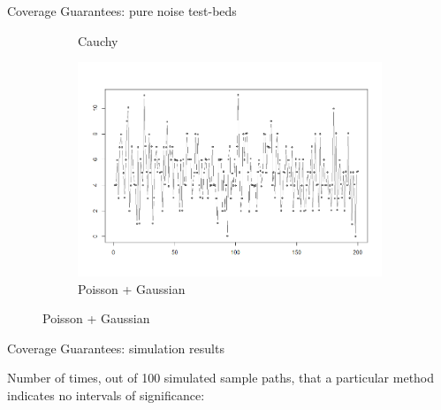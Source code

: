\documentclass{beamer}
\begin{document}
\begin{frame}{Coverage Guarantees: pure noise test-beds}
\begin{figure}
\begin{subfigure}[b]{0.3\textwidth}
    \caption{Cauchy}
\end{subfigure}
\begin{subfigure}[b]{0.3\textwidth}
    \centering
    \includegraphics[width=\textwidth]{../plots/poisson-normal-mix}
    \caption{Poisson + Gaussian}
\end{subfigure}
\end{figure}

\end{frame}


\begin{frame}{Coverage Guarantees: simulation results}

Number of times, out of 100 simulated sample paths, that a particular method indicates no intervals of significance:

\bigskip

\centering
{} 

\end{frame}
\end{document}
